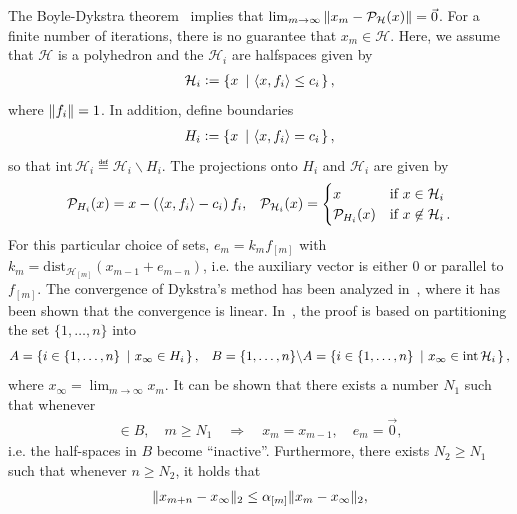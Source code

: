 \documentclass[hidelinks]{article}
\begin{document}
%
\par The Boyle-Dykstra theorem~\cite{DYKSTRA} implies that $\lim_{m\rightarrow\infty}\Vert x_m-\mathcal{P}_\mathcal{H}(x) \Vert=\vec0$. For a finite number of iterations, there is no guarantee that $x_m\in\mathcal{H}$. 
%
\newpage
Here, we assume that $\mathcal{H}$ is a polyhedron and the $\mathcal{H}_i$ are halfspaces given by
\begin{align}\label{eq:sets_i}
\mathcal{H}_i\vcentcolon=\left\{ x\ \left| \ \left\langle x , f_i \right\rangle \leq c_i \right. \right\},
\end{align}
where $\Vert f_i \Vert=1$. In addition, define boundaries
\begin{align}\label{eq:sets_i2}
H_i\vcentcolon=\left\{ x\ \left| \ \left\langle x , f_i \right\rangle = c_i \right. \right\},
\end{align}
so that $\text{int}\,\mathcal{H}_i\eqdef\mathcal{H}_i\backslash H_i$. The projections onto $H_i$ and $\mathcal{H}_i$ are given by
\begin{align}
&\mathcal{P}_{H_i}(x)=x-\left(\left\langle x , f_i \right\rangle - c_i\right)f_i,
&\mathcal{P}_{\mathcal{H}_i}(x)=\begin{cases}
x & \text{if } x\in\mathcal{H}_i\\
\mathcal{P}_{H_i}(x) & \text{if } x\not\in\mathcal{H}_i\,.
\end{cases}
\end{align}
For this particular choice of sets, $e_m = k_m f_{[m]}$ with $k_m=\text{dist}_{\mathcal{H}_{[m]}}(x_{m-1}+e_{m-n})$, i.e. the auxiliary vector is either $0$ or parallel to $f_{[m]}$. 
%
The convergence of Dykstra's method has been analyzed in~\cite{DYKSTRAPOLY2,DYKSTRAPOLY}, where it has been shown that the convergence is linear. In~\cite{DYKSTRAPOLY}, the proof is based on partitioning the set $\lbrace 1,\dots,n\rbrace$ into
\begin{align}
&A=\left\{ i\in\lbrace 1,\dots,n\rbrace\ \left| \ x_\infty\in H_i \right. \right\},
&B=\lbrace 1,\dots,n\rbrace\backslash A=\left\{ i\in\lbrace 1,\dots,n\rbrace\ \left| \ x_\infty\in\text{int}\,\mathcal{H}_i \right. \right\},
\end{align}
where $x_\infty=\lim_{m\rightarrow\infty}x_m$. It can be shown that there exists a number $N_1$ such that whenever
\begin{align}
[m]\in B,\quad m\geq N_1\quad\Rightarrow\quad x_m=x_{m-1},\quad e_m=\vec0,
\end{align}
i.e. the half-spaces in $B$ become ``inactive''. Furthermore, there exists $N_2\geq N_1$ such that whenever $n\geq N_2$, it holds that
\begin{align}
\Vert x_{m+n}-x_\infty \Vert_2\leq\alpha_{[m]}\Vert x_m-x_\infty \Vert_2,
\end{align}
\end{document}
